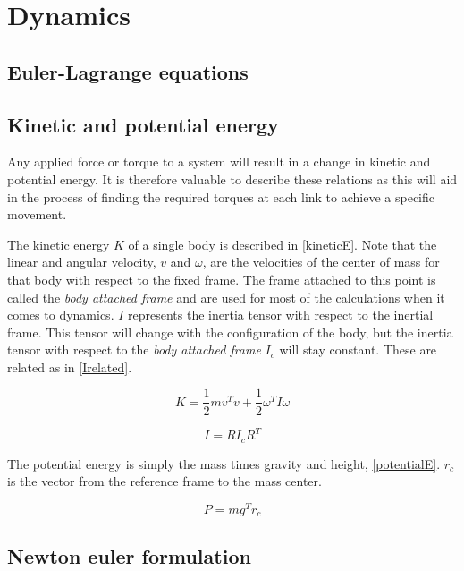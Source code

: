 \section{Dynamics}
\lipsum[1]
\subsection{Euler-Lagrange equations}
\subsection{Kinetic and potential energy}

Any applied force or torque to a system will result in a change in kinetic and potential energy. It is therefore valuable to describe these relations as this will aid in the process of finding the required torques at each link to achieve a specific movement.

The kinetic energy $K$ of a single body is described in \eqref{kineticE}. Note that the linear and angular velocity, $v$ and $\omega$, are the velocities of the center of mass for that body with respect to the fixed frame. The frame attached to this point is called the \textit{body attached frame} and are used for most of the calculations when it comes to dynamics. $I$ represents the inertia tensor with respect to the inertial frame.  This tensor will change with the configuration of the body, but the inertia tensor with respect to the \textit{body attached frame} $I_c$ will stay constant. These are related as in \eqref{Irelated}.

\begin{equation}\label{kineticE}
K = \frac{1}{2}mv^Tv + \frac{1}{2}\omega ^{T}  I \omega
\end{equation}

\begin{equation}\label{Irelated}
I = RI_cR^T
\end{equation}

The potential energy is simply the mass times gravity and height, \eqref{potentialE}. $r_c$ is the vector from the reference frame to the mass center.

\begin{equation}\label{potentialE}
P = mg^Tr_c
\end{equation}



\subsection{Newton euler formulation}